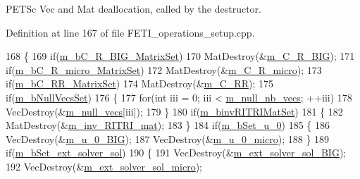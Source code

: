 P\+E\+T\+Sc Vec and Mat deallocation, called by the destructor. 



Definition at line 167 of file F\+E\+T\+I\+\_\+operations\+\_\+setup.\+cpp.


\begin{DoxyCode}
168 \{
169     \textcolor{keywordflow}{if}(\hyperlink{classcarl_1_1_f_e_t_i___operations_a2fbc3a5e789caab1c636fdc86304023e}{m\_bC\_R\_BIG\_MatrixSet})
170         MatDestroy(&\hyperlink{classcarl_1_1_f_e_t_i___operations_a397d6a5e3e4111e06bb1ec52abdc6fa8}{m\_C\_R\_BIG});
171     \textcolor{keywordflow}{if}(\hyperlink{classcarl_1_1_f_e_t_i___operations_adc75fb521a7adb09783a446896180e73}{m\_bC\_R\_micro\_MatrixSet})
172         MatDestroy(&\hyperlink{classcarl_1_1_f_e_t_i___operations_aa2123fe549c1916496e9ea7e656bb7ee}{m\_C\_R\_micro});
173     \textcolor{keywordflow}{if}(\hyperlink{classcarl_1_1_f_e_t_i___operations_a1f272a523aba46755b2883394947bde0}{m\_bC\_RR\_MatrixSet})
174         MatDestroy(&\hyperlink{classcarl_1_1_f_e_t_i___operations_abd5d326b088db98b2fbe6f2c8cbab5bc}{m\_C\_RR});
175     \textcolor{keywordflow}{if}(\hyperlink{classcarl_1_1_f_e_t_i___operations_a96f6ef39dd083e2f659cc0be7e35ff19}{m\_bNullVecsSet})
176     \{
177         \textcolor{keywordflow}{for}(\textcolor{keywordtype}{int} iii = 0; iii < \hyperlink{classcarl_1_1_f_e_t_i___operations_a6be71b08544858c4b4609bf2a2927a17}{m\_null\_nb\_vecs}; ++iii)
178             VecDestroy(&\hyperlink{classcarl_1_1_f_e_t_i___operations_a81ca84aa058155a0a0f586625c6f93b7}{m\_null\_vecs}[iii]);
179     \}
180     \textcolor{keywordflow}{if}(\hyperlink{classcarl_1_1_f_e_t_i___operations_a259bd691984bbbaa20dcf151adc9bc78}{m\_binvRITRIMatSet})
181     \{
182         MatDestroy(&\hyperlink{classcarl_1_1_f_e_t_i___operations_a5b61754f3ea2e4c674fd37f18ec0014b}{m\_inv\_RITRI\_mat});
183     \}
184     \textcolor{keywordflow}{if}(\hyperlink{classcarl_1_1_f_e_t_i___operations_abf724cc3aa790877475fcea5116802b0}{m\_bSet\_u\_0})
185     \{
186         VecDestroy(&\hyperlink{classcarl_1_1_f_e_t_i___operations_ad8097151d30d2d9b8acd6bc67caffcf4}{m\_u\_0\_BIG});
187         VecDestroy(&\hyperlink{classcarl_1_1_f_e_t_i___operations_a24aa345060f6ae75b71ce2071aa3a093}{m\_u\_0\_micro});    
188     \}
189     \textcolor{keywordflow}{if}(\hyperlink{classcarl_1_1_f_e_t_i___operations_af31024ec972af89dff3472ed65086db5}{m\_bSet\_ext\_solver\_sol})
190     \{
191         VecDestroy(&\hyperlink{classcarl_1_1_f_e_t_i___operations_a2dc346bc628b1639c0aaa9f3b0c5852d}{m\_ext\_solver\_sol\_BIG});
192         VecDestroy(&\hyperlink{classcarl_1_1_f_e_t_i___operations_a4e2a843baafa4a006fe429c2c82c466f}{m\_ext\_solver\_sol\_micro});  

\end{DoxyCode}
